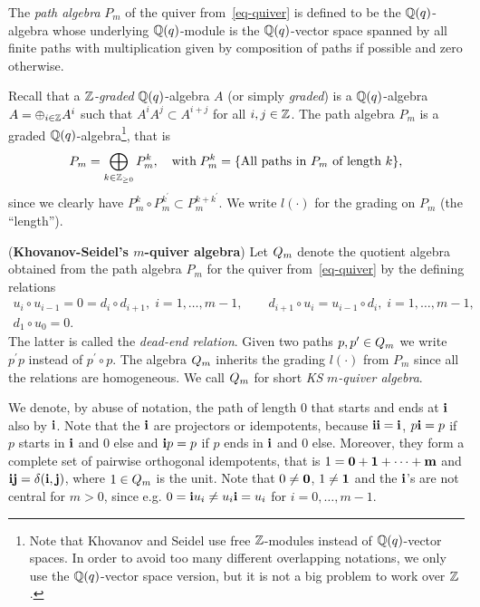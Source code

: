 The \textit{path algebra} $P_m$ of the quiver 
from~\eqref{eq-quiver} is defined to 
be the $\mathbb{Q}(q)$-algebra whose underlying 
$\mathbb{Q}(q)$-module is the $\mathbb{Q}(q)$-vector 
space spanned by all finite paths 
with multiplication given by composition 
of paths if possible and zero otherwise.


Recall that a $\mathbb{Z}$\textit{-graded} 
$\mathbb{Q}(q)$-algebra $A$ (or simply \textit{graded}) is a 
$\mathbb{Q}(q)$-algebra $A=\oplus_{i\in\mathbb{Z}} A^i$ such that $A^iA^j\subset A^{i+j}$ 
for all $i,j\in\mathbb{Z}$.
The path algebra $P_m$ is a graded 
$\mathbb{Q}(q)$-algebra\footnote{Note that Khovanov and Seidel 
use free $\mathbb{Z}$-modules instead of $\mathbb{Q}(q)$-vector spaces. 
In order to avoid too many different overlapping notations, 
we only use the $\mathbb{Q}(q)$-vector space version, but it is not a big problem to work over $\mathbb{Z}$.}, 
that is
\[
P_m=\bigoplus_{k\in\mathbb{Z}_{\geq 0}}P^k_m,\quad\text{with}\; P^k_m=\{\text{All paths in }P_m\text{ of length }k\},
\]
since we clearly have 
$P^k_m\circ P^{k^{\prime}}_m\subset P^{k+k^{\prime}}_m$. We 
write $l(\cdot)$ for the grading on $P_m$ (the ``length'').





\begin{defn}\label{def-ksquiver1}(\textbf{Khovanov-Seidel's $m$-quiver algebra})
Let $Q_{m}$ denote the quotient algebra obtained from the path algebra 
$P_m$ for the quiver from~\eqref{eq-quiver} by the defining relations
\begin{gather*}
u_{i}\circ u_{i-1}=0=d_i\circ d_{i+1},\;i=1,\dots,m-1,\quad\quad d_{i+1}\circ u_i=u_{i-1}\circ d_{i},\;i=1,\dots,m-1,\\
d_1\circ u_0=0.
\end{gather*}
The latter is called the \textit{dead-end relation}.
Given two paths $p,p^{\prime}\in Q_{m}$ we write $p^{\prime}p$ 
instead of $p^{\prime}\circ p$. The algebra $Q_{m}$ 
inherits the grading $l(\cdot)$ from $P_m$ 
since all the relations are homogeneous. 
We call $Q_{m}$ for short \textit{KS} $m$\textit{-quiver algebra}.
\end{defn}




We denote, by abuse of notation, the path of length $0$ that 
starts and ends at $\boldsymbol{\mathrm{i}}$ also by $\boldsymbol{\mathrm{i}}$. Note that 
the $\boldsymbol{\mathrm{i}}$ are projectors or idempotents, because 
$\boldsymbol{\mathrm{i}}\boldsymbol{\mathrm{i}}=\boldsymbol{\mathrm{i}}$, $p\boldsymbol{\mathrm{i}}=p$ if $p$ starts in $\boldsymbol{\mathrm{i}}$ 
and $0$ else and $\boldsymbol{\mathrm{i}} p=p$ if $p$ ends in $\boldsymbol{\mathrm{i}}$ 
and $0$ else. Moreover, they form a complete set of 
pairwise orthogonal idempotents, that 
is $1=\boldsymbol{0}+\boldsymbol{1}+\dots+\boldsymbol{\mathrm{m}}$ and $\boldsymbol{\mathrm{i}}\boldsymbol{\mathrm{j}}=\delta(\boldsymbol{\mathrm{i}},\boldsymbol{\mathrm{j}})$, 
where $1\in Q_{m}$ is the unit. Note that $0\neq \boldsymbol{0}$, 
$1\neq \boldsymbol{1}$ and the $\boldsymbol{\mathrm{i}}$'s are not central 
for $m>0$, since e.g. $0=\boldsymbol{\mathrm{i}} u_i\neq u_i\boldsymbol{\mathrm{i}}=u_i$ for $i=0,\dots,m-1$.



